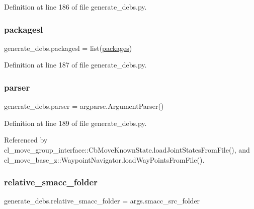 Definition at line 186 of file generate\+\_\+debs.\+py.

\mbox{\label{namespacegenerate__debs_acac340506bc1d8ca0d0881b9c00bfea2}} 
\subsubsection{\texorpdfstring{packagesl}{packagesl}}
{\footnotesize\ttfamily generate\+\_\+debs.\+packagesl = list(\hyperlink{namespacegenerate__debs_a40d4732827c5678f3f48354238245e1d}{packages})}



Definition at line 187 of file generate\+\_\+debs.\+py.

\mbox{\label{namespacegenerate__debs_a4a9ae4bb85fc62d7973ea3d09ced6c26}} 
\subsubsection{\texorpdfstring{parser}{parser}}
{\footnotesize\ttfamily generate\+\_\+debs.\+parser = argparse.\+Argument\+Parser()}



Definition at line 189 of file generate\+\_\+debs.\+py.



Referenced by cl\+\_\+move\+\_\+group\+\_\+interface\+::\+Cb\+Move\+Known\+State.\+load\+Joint\+States\+From\+File(), and cl\+\_\+move\+\_\+base\+\_\+z\+::\+Waypoint\+Navigator.\+load\+Way\+Points\+From\+File().

\mbox{\label{namespacegenerate__debs_abf6925bd06ac1da3981fe638eefb5a61}} 
\subsubsection{\texorpdfstring{relative\+\_\+smacc\+\_\+folder}{relative\_smacc\_folder}}
{\footnotesize\ttfamily generate\+\_\+debs.\+relative\+\_\+smacc\+\_\+folder = args.\+smacc\+\_\+src\+\_\+folder}



